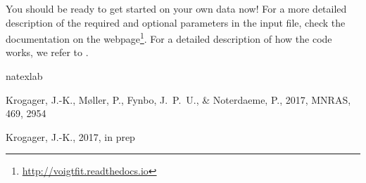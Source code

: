 \documentclass[a4paper]{article}
\begin{document}
You should be ready to get started on your own data now! For a more detailed description of the required and optional parameters in the input file, check the documentation on the webpage\footnote{\url{http://voigtfit.readthedocs.io}}. For a detailed description of how the code works, we refer to \citet{VoigtFit}.

\def\aap{A\&A}
\def\mnras{MNRAS}



\begin{thebibliography}{2}
\expandafter\ifx\csname natexlab\endcsname\relax\def\natexlab#1{#1}\fi

{Krogager}, J.-K., {M{\o}ller}, P., {Fynbo}, J.~P.~U., \& {Noterdaeme}, P., 2017, \mnras, 469, 2954

{Krogager}, J.-K., 2017, in prep

\end{thebibliography}
\end{document}
